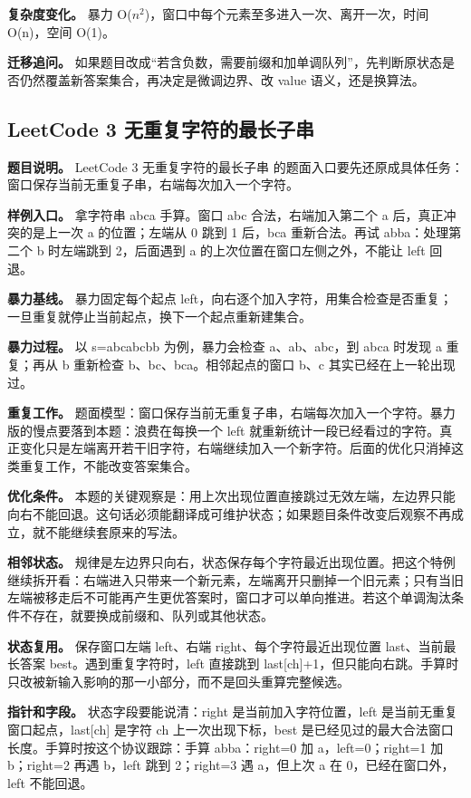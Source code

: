 \textbf{复杂度变化。} 暴力 O(\ensuremath{n^{2}})，窗口中每个元素至多进入一次、离开一次，时间 O(n)，空间 O(1)。

\textbf{迁移追问。} 如果题目改成“若含负数，需要前缀和加单调队列”，先判断原状态是否仍然覆盖新答案集合，再决定是微调边界、改 value 语义，还是换算法。

\subsection{LeetCode 3 无重复字符的最长子串}

\textbf{题目说明。} LeetCode 3 无重复字符的最长子串 的题面入口要先还原成具体任务：窗口保存当前无重复子串，右端每次加入一个字符。

\textbf{样例入口。} 拿字符串 abca 手算。窗口 abc 合法，右端加入第二个 a 后，真正冲突的是上一次 a 的位置；左端从 0 跳到 1 后，bca 重新合法。再试 abba：处理第二个 b 时左端跳到 2，后面遇到 a 的上次位置在窗口左侧之外，不能让 left 回退。

\textbf{暴力基线。} 暴力固定每个起点 left，向右逐个加入字符，用集合检查是否重复；一旦重复就停止当前起点，换下一个起点重新建集合。

\textbf{暴力过程。} 以 s=abcabcbb 为例，暴力会检查 a、ab、abc，到 abca 时发现 a 重复；再从 b 重新检查 b、bc、bca。相邻起点的窗口 b、c 其实已经在上一轮出现过。

\textbf{重复工作。} 题面模型：窗口保存当前无重复子串，右端每次加入一个字符。暴力版的慢点要落到本题：浪费在每换一个 left 就重新统计一段已经看过的字符。真正变化只是左端离开若干旧字符，右端继续加入一个新字符。后面的优化只消掉这类重复工作，不能改变答案集合。

\textbf{优化条件。} 本题的关键观察是：用上次出现位置直接跳过无效左端，左边界只能向右不能回退。这句话必须能翻译成可维护状态；如果题目条件改变后观察不再成立，就不能继续套原来的写法。

\textbf{相邻状态。} 规律是左边界只向右，状态保存每个字符最近出现位置。把这个特例继续拆开看：右端进入只带来一个新元素，左端离开只删掉一个旧元素；只有当旧左端被移走后不可能再产生更优答案时，窗口才可以单向推进。若这个单调淘汰条件不存在，就要换成前缀和、队列或其他状态。

\textbf{状态复用。} 保存窗口左端 left、右端 right、每个字符最近出现位置 last、当前最长答案 best。遇到重复字符时，left 直接跳到 last[ch]+1，但只能向右跳。手算时只改被新输入影响的那一小部分，而不是回头重算完整候选。

\textbf{指针和字段。} 状态字段要能说清：right 是当前加入字符位置，left 是当前无重复窗口起点，last[ch] 是字符 ch 上一次出现下标，best 是已经见过的最大合法窗口长度。手算时按这个协议跟踪：手算 abba：right=0 加 a，left=0；right=1 加 b；right=2 再遇 b，left 跳到 2；right=3 遇 a，但上次 a 在 0，已经在窗口外，left 不能回退。

